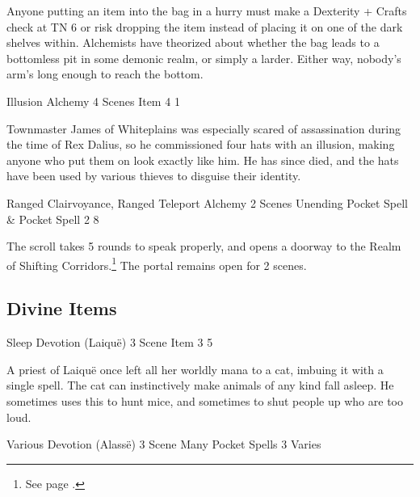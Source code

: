 \begin{multicols}{2}
Anyone putting an item into the bag in a hurry must make a Dexterity + Crafts check at TN 6 or risk dropping the item instead of placing it on one of the dark shelves within.  Alchemists have theorized about whether the bag leads to a bottomless pit in some demonic realm, or simply a larder.  Either way, nobody's arm's long enough to reach the bottom.

	{Illusion}%
	{Alchemy}%
	{4 Scenes}%
	{Item}%
	{4}%
	{1}%

Townmaster James of Whiteplains was especially scared of assassination during the time of Rex Dalius, so he commissioned four hats with an illusion, making anyone who put them on look exactly like him.
He has since died, and the hats have been used by various thieves to disguise their identity.

	{Ranged Clairvoyance, Ranged Teleport}%
	{Alchemy}%
	{2 Scenes}%
	{Unending Pocket Spell \& Pocket Spell}%
	{2}%
	{8}%

\label{portalscroll}

The scroll takes 5 rounds to speak properly, and opens a doorway to the Realm of Shifting Corridors.\footnote{See page \pageref{shiftingcorridors}.}
The portal remains open for 2 scenes.

\subsection{Divine Items}

	{Sleep}%
	{Devotion (Laiqu\"{e})}%
	{3 Scene}%
	{Item}%
	{3}%
	{5}%

A priest of Laiqu\"{e} once left all her worldly mana to a cat, imbuing it with a single spell.
The cat can instinctively make animals of any kind fall asleep.
He sometimes uses this to hunt mice, and sometimes to shut people up who are too loud.

	{Various}%
	{Devotion (Alass\"{e})}%
	{3 Scene}%
	{Many Pocket Spells}%
	{3}%
	{Varies}\label{deckofmanythings}%


\end{multicols}
